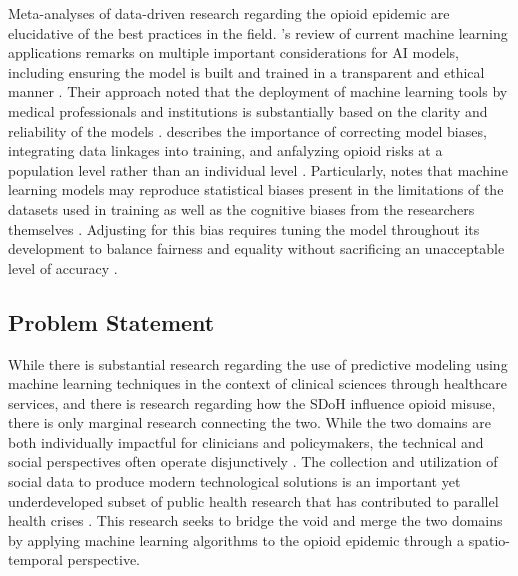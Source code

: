 \documentclass[journal]{IEEEtran}
\begin{document}
    Meta-analyses of data-driven research regarding the opioid epidemic are elucidative of the best practices in the field. \citeauthor{gabrielReviewLeveragingArtificial2025}'s review of current machine learning applications remarks on multiple important considerations for AI models, including ensuring the model is built and trained in a transparent and ethical manner \cite{gabrielReviewLeveragingArtificial2025}. Their approach noted that the deployment of machine learning tools by medical professionals and institutions is substantially based on the clarity and reliability of the models \cite{gabrielReviewLeveragingArtificial2025, ramirezmedinaSystematicReviewMachine2025}. \citeauthor{bharatBigDataPredictive2021} describes the importance of correcting model biases, integrating data linkages into training, and anfalyzing opioid risks at a population level rather than an individual level  \cite{bharatBigDataPredictive2021}. Particularly, \citeauthor{bharatBigDataPredictive2021} notes that machine learning models may reproduce statistical biases present in the limitations of the datasets used in training as well as the cognitive biases from the researchers themselves \cite{bharatBigDataPredictive2021}. Adjusting for this bias requires tuning the model throughout its development to balance fairness and equality without sacrificing an unacceptable level of accuracy \cite{bharatBigDataPredictive2021}.

    \subsection{Problem Statement}

    While there is substantial research regarding the use of predictive modeling using machine learning techniques in the context of clinical sciences through healthcare services, and there is research regarding how the SDoH influence opioid misuse, there is only marginal research connecting the two. While the two domains are both individually impactful for clinicians and policymakers, the technical and social perspectives often operate disjunctively \cite{blancoAmericasOpioidCrisis2020}. The collection and utilization of social data to produce modern technological solutions is an important yet underdeveloped subset of public health research that has contributed to parallel health crises \cite{bharatBigDataPredictive2021, blancoAmericasOpioidCrisis2020, baduDataDrivenEpidemiologicalApproach2025}. This research seeks to bridge the void and merge the two domains by applying machine learning algorithms to the opioid epidemic through a spatio-temporal perspective.
\end{document}
